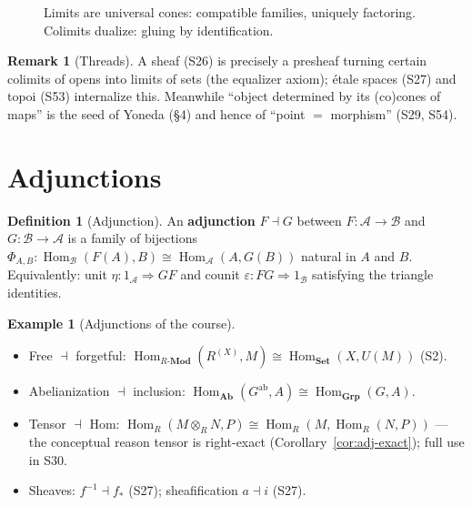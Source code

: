 \documentclass[11pt,a4paper]{article}
\theoremstyle{definition}
\newtheorem{definition}[theorem]{Definition}
\newtheorem{example}[theorem]{Example}
\newtheorem{remark}[theorem]{Remark}
\newcommand{\Hom}{\operatorname{Hom}}
\newcommand{\Set}{\mathbf{Set}}
\newcommand{\Grp}{\mathbf{Grp}}
\begin{document}
\begin{figure}[h]
\centering
{}
\caption{Limits are universal cones: compatible families, uniquely factoring. Colimits dualize:
gluing by identification.}
\end{figure}

\begin{remark}[Threads]
A sheaf (S26) is precisely a presheaf turning certain colimits of opens into limits of sets (the
equalizer axiom); \'etale spaces (S27) and topoi (S53) internalize this. Meanwhile
``object determined by its (co)cones of maps'' is the seed of Yoneda (\S4) and hence of
``point $=$ morphism'' (S29, S54).
\end{remark}

\section{Adjunctions}

\begin{definition}[Adjunction]
An \textbf{adjunction} $F\dashv G$ between $F:\mathcal A\to\mathcal B$ and $G:\mathcal B\to\mathcal A$
is a family of bijections $\Phi_{A,B}:\Hom_{\mathcal B}(F(A),B)\cong\Hom_{\mathcal A}(A,G(B))$
natural in $A$ and $B$. Equivalently: unit $\eta:1_{\mathcal A}\Rightarrow GF$ and counit
$\varepsilon:FG\Rightarrow 1_{\mathcal B}$ satisfying the triangle identities.
\end{definition}

\begin{example}[Adjunctions of the course]\label{ex:adj}
\begin{itemize}
  \item Free $\dashv$ forgetful: $\Hom_{R\text{-}\mathbf{Mod}}(R^{(X)},M)\cong\Hom_{\Set}(X,U(M))$ (S2).
  \item Abelianization $\dashv$ inclusion: $\Hom_{\mathbf{Ab}}(G^{\mathrm{ab}},A)\cong\Hom_{\Grp}(G,A)$.
  \item Tensor $\dashv$ Hom: $\Hom_R(M\otimes_R N,P)\cong\Hom_R(M,\Hom_R(N,P))$ --- the conceptual
    reason tensor is right-exact (Corollary~\ref{cor:adj-exact}); full use in S30.
  \item Sheaves: $f^{-1}\dashv f_*$ (S27); sheafification $a\dashv i$ (S27).
\end{itemize}
\end{example}
\end{document}

